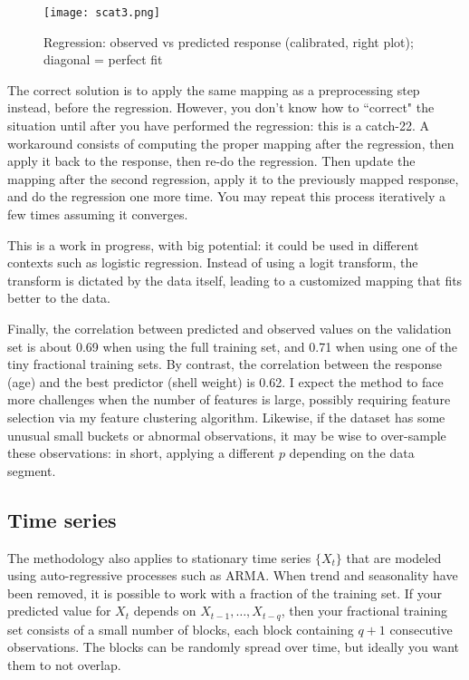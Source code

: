 \documentclass[oneside,10pt]{book}
\begin{document}
\begin{figure}[H]
\centering
\texttt{[image: scat3.png]}  
\caption{Regression: observed vs predicted response (calibrated, right plot); diagonal = perfect fit} 
\label{fig:prqerw76}
\end{figure}

The correct solution is to apply the same mapping as a preprocessing step instead, before the regression. However, you don't know how to ``correct" the situation until after you have performed the regression: this is a catch-22. A workaround consists of computing the proper
 mapping after the regression, then apply it back to the response, then re-do the regression. Then update the mapping after the second regression, apply it to the previously mapped response, and do the regression one more time. You may repeat this process iteratively a few times assuming it converges.  

This is a work in progress, with big potential: it could be used in different contexts such as logistic regression. Instead of using a logit transform, the transform is dictated by the data itself, leading to a customized mapping that fits better to the data.

Finally, the correlation between predicted and observed values on the validation set is about 0.69 when using the full training set, and 0.71 
 when using one of the tiny fractional training sets. By contrast, the correlation between the response (age) and the best
 predictor (shell weight) is 0.62. I expect the method to face more challenges when the number of features is large, possibly requiring feature selection via my feature clustering algorithm. Likewise, if the dataset has some unusual small buckets or abnormal observations, it may be wise
 to over-sample these observations: in short, applying a different $p$ depending on the data segment.





\subsection{Time series}

The methodology also applies to stationary time series $\{X_t\}$ that are modeled using auto-regressive processes such as ARMA. When trend and seasonality have been removed, it is possible to work with a fraction of the training set. If your predicted value for $X_t$ depends on $X_{t-1},\dots,X_{t-q}$, then your fractional training set consists of a small number of blocks, each block containing
 $q+1$ consecutive observations. The blocks can be randomly spread over time, but ideally you want them to not overlap.
\end{document}
